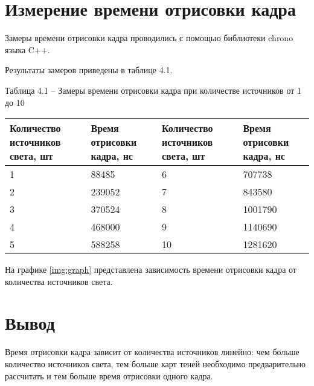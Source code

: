 \section{Измерение времени отрисовки кадра}

Замеры времени отрисовки кадра проводились с помощью библиотеки chrono языка C++.  

Результаты замеров приведены в таблице 4.1.

\begin{table}[h]
	\begin{flushleft}
		Таблица 4.1 -- Замеры времени отрисовки кадра при количестве источников от 1 до 10
	\end{flushleft}
	\begin{center}
		\label{tbl:time}
		\begin{tabular}{|p{3.6cm}|p{3.5cm}|p{3.6cm}|p{3.5cm}|}
			\hline
			\bfseries Количество источников света, шт & \bfseries Время отрисовки кадра, нс & \bfseries Количество источников света, шт & \bfseries Время отрисовки кадра, нс\\
			\hline
			1 & 88485 & 6 & 707738\\
			\hline
			2 & 239052 & 7 & 843580\\
			\hline
			3 & 370524 & 8 & 1001790\\
			\hline
			4 & 468000 & 9 & 1140690\\
			\hline
			5 & 588258 & 10 & 1281620\\
			\hline
		\end{tabular}
	\end{center}
\end{table}

На графике \ref{img:graph} представлена зависимость времени отрисовки кадра от количества источников света.


\newpage

\pagebreak

\section*{Вывод}

Время отрисовки кадра зависит от количества источников линейно: чем больше количество источников света, тем больше карт теней необходимо предварительно рассчитать и тем больше время отрисовки одного кадра.

